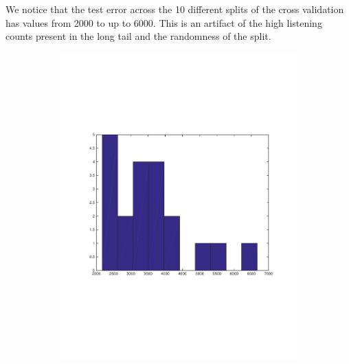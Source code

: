 We notice that the test error across the 10 different splits of the cross validation has values from 2000 to up to 6000. This is an artifact of the high listening counts present in the long tail and the randomness of the split.
\begin{figure}[h]
  \centering
  \begin{subfigure}[b]{0.45\textwidth}
   \includegraphics[width=\textwidth]{figures/distributionRMSE.pdf}
    \caption{}
  \end{subfigure}
  \begin{subfigure}[b]{0.45\textwidth}

\end{subfigure}
\end{figure}
